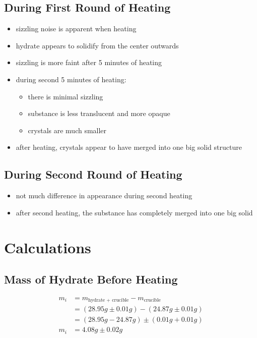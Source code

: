 \documentclass{article}
\begin{document}
\subsection{During First Round of Heating}

\begin{itemize}
    \item sizzling noise is apparent when heating
    \item hydrate appears to solidify from the center outwards
    \item sizzling is more faint after 5 minutes of heating
    \item during second 5 minutes of heating:
          \begin{itemize}
              \item there is minimal sizzling
              \item substance is less translucent and more opaque
              \item crystals are much smaller
          \end{itemize}
    \item after heating, crystals appear to have merged into one big solid structure
\end{itemize}

\subsection{During Second Round of Heating}

\begin{itemize}
    \item not much difference in appearance during second heating
    \item after second heating, the substance has completely merged into one big solid
\end{itemize}

\section{Calculations}

\subsection{Mass of Hydrate Before Heating}

\begin{align*}
    m_i & = m_{\text{hydrate + crucible}} - m_{\text{crucible}}         \\
        & = (28.95\si{g} \pm 0.01\si{g}) - (24.87\si{g} \pm 0.01\si{g}) \\
        & = (28.95\si{g} - 24.87\si{g}) \pm (0.01\si{g} + 0.01\si{g})   \\
    m_i & = 4.08\si{g} \pm 0.02\si{g}
\end{align*}
\end{document}
